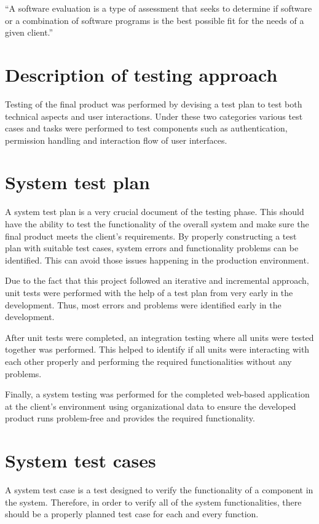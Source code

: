 \documentclass[12pt]{report}
\begin{document}
``A software evaluation is a type of assessment that seeks to determine if software or a combination of software programs is the best possible fit for the needs of a given client.''\cite{tatum_2020_software_evaluation}


\section{Description of testing approach}
Testing of the final product was performed by devising a test plan to test both technical aspects and user interactions. Under these two categories various test cases and tasks were performed to test components such as authentication, permission handling and interaction flow of user interfaces.


\section{System test plan}
A system test plan is a very crucial document of the testing phase. This should have the ability to test the functionality of the overall system and make sure the final product meets the client's requirements. By properly constructing a test plan with suitable test cases, system errors and functionality problems can be identified. This can avoid those issues happening in the production environment.

Due to the fact that this project followed an iterative and incremental approach, unit tests were performed with the help of a test plan from very early in the development. Thus, most errors and problems were identified early in the development.

After unit tests were completed, an integration testing where all units were tested together was performed. This helped to identify if all units were interacting with each other properly and performing the required functionalities without any problems.

Finally, a system testing was performed for the completed web-based application at the client's environment using organizational data to ensure the developed product runs problem-free and provides the required functionality.

\section{System test cases}
A system test case is a test designed to verify the functionality of a component in the system. Therefore, in order to verify all of the system functionalities, there should be a properly planned test case for each and every function.
\end{document}
